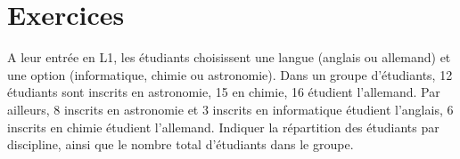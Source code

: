\documentclass[../PolyS4.tex]{subfiles}
\begin{document}
\section{Exercices}
%
%
%
%
%
%
%
%



\vskip0.2cm
A leur entrée en L1, les étudiants choisissent une langue (anglais ou allemand) et une option (informatique, chimie ou astronomie).
Dans un groupe d'étudiants, 12 étudiants sont inscrits en astronomie, 15 en chimie, 16 étudient l'allemand. Par ailleurs, 8 inscrits en astronomie et 3 inscrits en informatique étudient l'anglais,  6 inscrits en chimie étudient l'allemand.\newline
Indiquer la répartition des étudiants par discipline, ainsi que le nombre total d'étudiants dans le groupe.\\


\end{document}
